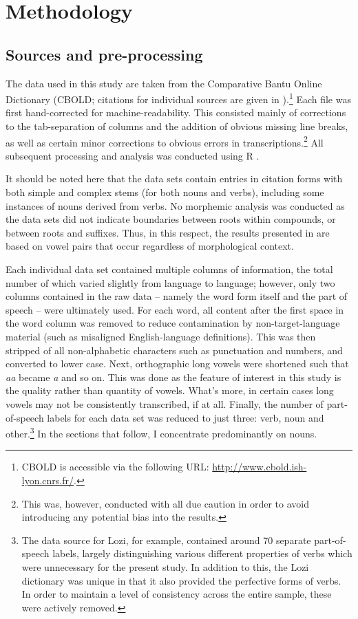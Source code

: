 \documentclass[output=paper]{langscibook}
\begin{document}
\section{Methodology}

\subsection{Sources and pre-processing}

The data used in this study are taken from the Comparative Bantu Online Dictionary (CBOLD; citations for individual sources are given in ).\footnote{CBOLD is accessible via the following URL: \url{http://www.cbold.ish-lyon.cnrs.fr/}.} Each file was first hand-corrected for machine-readability. This consisted mainly of corrections to the tab-separation of columns and the addition of obvious missing line breaks, as well as certain minor corrections to obvious errors in transcriptions.\footnote{This was, however, conducted with all due caution in order to avoid introducing any potential bias into the results.} All subsequent processing and analysis was conducted using R \citep{R}.

It should be noted here that the data sets contain entries in citation forms with both simple and complex stems (for both nouns and verbs), including some instances of nouns derived from verbs. No morphemic analysis was conducted as the data sets did not indicate boundaries between roots within compounds, or between roots and suffixes. Thus, in this respect, the results presented in  are based on vowel pairs that occur regardless of morphological context.

Each individual data set contained multiple columns of information, the total number of which varied slightly from language to language; however, only two columns contained in the raw data -- namely the word form itself and the part of speech -- were ultimately used. For each word, all content after the first space in the word column was removed to reduce contamination by non-target-language material (such as misaligned English-language definitions). This was then stripped of all non-alphabetic characters such as punctuation and numbers, and converted to lower case. Next, orthographic long vowels were shortened such that \textit{aa} became \textit{a} and so on. This was done as the feature of interest in this study is the quality rather than quantity of vowels. What's more, in certain cases long vowels may not be consistently transcribed, if at all. Finally, the number of part-of-speech labels for each data set was reduced to just three: verb, noun and other.\footnote{The data source for Lozi, for example, contained around 70 separate part-of-speech labels, largely distinguishing various different properties of verbs which were unnecessary for the present study. In addition to this, the Lozi dictionary was unique in that it also provided the perfective forms of verbs. In order to maintain a level of consistency across the entire sample, these were actively removed.} In the sections that follow, I concentrate predominantly on nouns.
\end{document}

